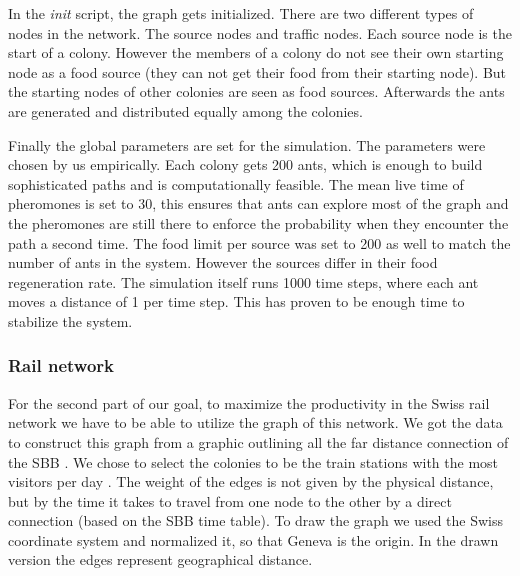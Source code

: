 In the \textit{init} script, the graph gets initialized. There are two different types of nodes in the network. The source nodes and traffic nodes.
Each source node is the start of a colony. However the members of a colony do not see their own starting node as a food source (they can not get their food from their starting node). But the starting nodes of other colonies are seen as food sources. Afterwards the ants are generated and distributed equally among the colonies. 

Finally the global parameters are set for the simulation. The parameters were chosen by us empirically. Each colony gets 200 ants, which is enough to build sophisticated paths and is computationally feasible. The mean live time of pheromones is set to 30, this ensures that ants can explore most of the graph and the pheromones are still there to enforce the probability when they encounter the path a second time. The food limit per source was set to 200 as well to match the number of ants in the system. However the sources differ in their food regeneration rate. The simulation itself runs 1000 time steps, where each ant moves a distance of 1 per time step. This has proven to be enough time to stabilize the system.

\subsubsection{Rail network}
For the second part of our goal, to maximize the productivity in the Swiss rail network we have to be able to utilize the graph of this network. We got the data to construct this graph from a graphic outlining all the far distance connection of the SBB \citep{SbbStats2}. We chose to select the colonies to be the train stations with the most visitors per day \citep{SbbStats1}. The weight of the edges is not given by the physical distance, but by the time it takes to travel from one node to the other by a direct connection (based on the SBB time table)\citep{SbbStats3}. To draw the graph we used the Swiss coordinate system and normalized it, so that Geneva is the origin. In the drawn version the edges represent geographical distance.

